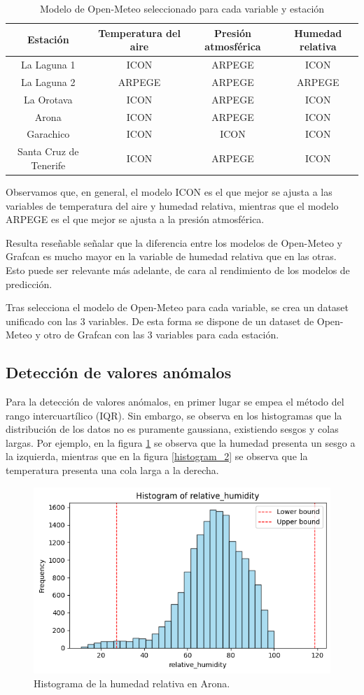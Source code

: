 \begin{table}[htb]
    \centering
    \begin{tabular}{|c|c|c|c|}
        \hline
        Estación & Temperatura del aire & Presión atmosférica & Humedad relativa \\
        \hline
        La Laguna 1 & ICON & ARPEGE & ICON \\
        La Laguna 2 & ARPEGE & ARPEGE & ARPEGE \\
        La Orotava & ICON & ARPEGE & ICON \\
        Arona & ICON & ARPEGE & ICON \\
        Garachico & ICON & ICON & ICON \\
        Santa Cruz de Tenerife & ICON & ARPEGE & ICON \\
        \hline
    \end{tabular}
    \caption{Modelo de Open-Meteo seleccionado para cada variable y estación}
    \label{tabla_modelos_seleccionados}
\end{table}
Observamos que, en general, el modelo ICON es el que mejor se ajusta a las variables de temperatura del aire y humedad relativa,
 mientras que el modelo ARPEGE es el que mejor se ajusta a la presión atmosférica.

 Resulta reseñable señalar que la diferencia entre los modelos de Open-Meteo y Grafcan es mucho mayor en la variable 
 de humedad relativa que en las otras. Esto puede ser relevante más adelante, de cara al rendimiento de los modelos de predicción. 

 \bigskip
 Tras selecciona el modelo de Open-Meteo para cada variable, se crea un dataset unificado con las 3 variables. De esta forma se dispone 
 de un dataset de Open-Meteo y otro de Grafcan con las 3 variables para cada estación.

\subsection{Detección de valores anómalos}
Para la detección de valores anómalos, en primer lugar se empea el método del rango intercuartílico (IQR). 
Sin embargo, se observa en los histogramas que la distribución de los datos no es puramente gaussiana, existiendo sesgos y colas largas.
Por ejemplo, en la figura \ref{histogram_1} se observa que la humedad presenta un sesgo a la izquierda, mientras que en la figura 
\ref{histogram_2} se observa que la temperatura presenta una cola larga a la derecha.

\begin{figure}
    \centering
    \includegraphics[width=.5\linewidth]{images/histogram_humidity.png}
    \caption{Histograma de la humedad relativa en Arona.}
    \label{histogram_1}
\end{figure}


